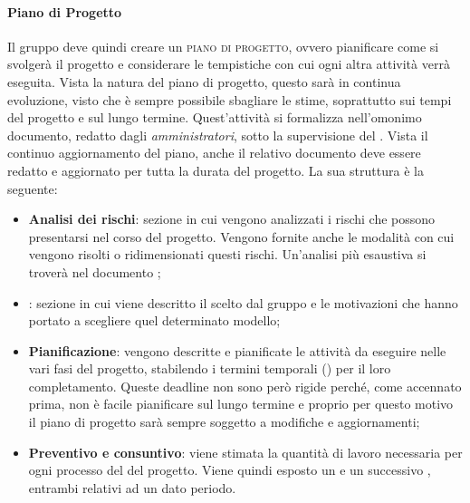 \documentclass[../norme_di_progetto.tex]{subfiles}
\begin{document}
\paragraph{Piano di Progetto}
Il gruppo deve quindi creare un \textsc{piano di progetto}, ovvero pianificare come si svolgerà il progetto e considerare le tempistiche con cui ogni altra attività verrà eseguita. Vista la natura del piano di progetto, questo sarà in continua evoluzione, visto che è sempre possibile sbagliare le stime, soprattutto sui tempi del progetto e sul lungo termine. Quest'attività si formalizza nell'omonimo documento, redatto dagli \emph{amministratori}, sotto la supervisione del \emph{}. Vista il continuo aggiornamento del piano, anche il relativo documento deve essere redatto e aggiornato per tutta la durata del progetto. La sua struttura è la seguente:
\begin{itemize}
    \item \textbf{Analisi dei rischi}: sezione in cui vengono analizzati i rischi che possono presentarsi nel corso del progetto. Vengono fornite anche le modalità con cui vengono risolti o ridimensionati questi rischi. Un'analisi più esaustiva si troverà nel documento ;
    \item \textbf{}: sezione in cui viene descritto il  scelto dal gruppo e le motivazioni che hanno portato a scegliere quel determinato modello;
    \item \textbf{Pianificazione}: vengono descritte e pianificate le attività da eseguire nelle vari fasi del progetto, stabilendo i termini temporali () per il loro completamento. Queste deadline non sono però rigide perché, come accennato prima, non è facile pianificare sul lungo termine e proprio per questo motivo il piano di progetto sarà sempre soggetto a modifiche e aggiornamenti;
    \item \textbf{Preventivo e consuntivo}: viene stimata la quantità di lavoro necessaria per ogni processo del  del progetto. Viene quindi esposto un  e un successivo , entrambi relativi ad un dato periodo.
\end{itemize}
\end{document}
